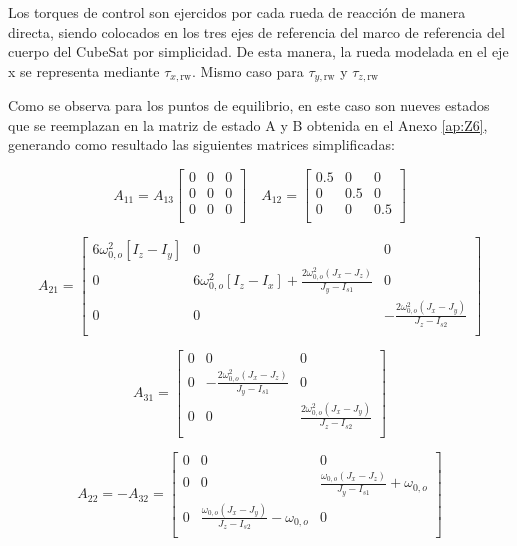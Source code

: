 Los torques de control son ejercidos por cada rueda de reacción de manera directa, siendo colocados en los tres ejes de referencia del marco de referencia del cuerpo del CubeSat por simplicidad. De esta manera, la rueda modelada en el eje x se representa mediante $\tau_{x, \text{rw}}$. Mismo caso para $\tau_{y, \text{rw}}$ y $\tau_{z, \text{rw}}$

Como se observa para los puntos de equilibrio, en este caso son nueves estados que se reemplazan en la matriz de estado A y B obtenida en el Anexo \ref{ap:Z6}, generando como resultado las siguientes matrices simplificadas:

\[
A_{11} = A_{13}
\begin{bmatrix}
	0 & 0 & 0 \\
	0 & 0 & 0 \\
	0 & 0 & 0 \\
\end{bmatrix} \quad
A_{12} = 
\begin{bmatrix}
	0.5 & 0 & 0 \\
	0 & 0.5 & 0 \\
	0 & 0 & 0.5 \\
\end{bmatrix}
\]

\[
A_{21} = 
\begin{bmatrix}
	 6 \omega_{0,o}^2 \left[I_z - I_y\right]  & 0 & 0 \\
	0 & 6 \omega_{0,o}^2 \left[I_z - I_x\right] + \frac{2 \omega_{0,o}^2 \left(J_x - J_z\right)}{J_y - I_{s1}}
	 & 0 \\
	0 & 0 &  -\frac{2 \omega_{0,o}^2 \left(J_x - J_y\right)}{J_z - I_{s2}}
	 \\
\end{bmatrix}
\]

\[
A_{31} = 
\begin{bmatrix}
	0  & 0 & 0 \\
	0 & - \frac{2 \omega_{0,o}^2 \left(J_x - J_z\right)}{J_y - I_{s1}}
	& 0 \\
	0 & 0 &  \frac{2 \omega_{0,o}^2 \left(J_x - J_y\right)}{J_z - I_{s2}}
	\\
\end{bmatrix}
\]

\[
A_{22} = -A_{32} = 
\begin{bmatrix}
	0  & 0 & 0 \\
	0  & 0 & \frac{\omega_{0,o} \left(J_x - J_z\right)}{J_y - I_{s1}} + \omega_{0,o} \\
	0 & \frac{\omega_{0,o} \left(J_x - J_y\right)}{J_z - I_{s2}} - \omega_{0,o} & 0	\\
\end{bmatrix}
\]

